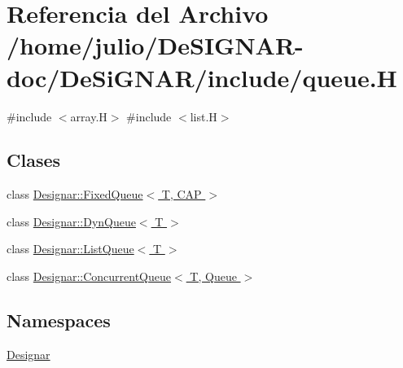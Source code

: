 \hypertarget{queue_8_h}{}\section{Referencia del Archivo /home/julio/\+De\+S\+I\+G\+N\+A\+R-\/doc/\+De\+Si\+G\+N\+A\+R/include/queue.H}
\label{queue_8_h}
{\ttfamily \#include $<$array.\+H$>$}\newline
{\ttfamily \#include $<$list.\+H$>$}\newline
\subsection*{Clases}
\begin{DoxyCompactItemize}
\item 
class \hyperlink{class_designar_1_1_fixed_queue}{Designar\+::\+Fixed\+Queue$<$ T, C\+A\+P $>$}
\item 
class \hyperlink{class_designar_1_1_dyn_queue}{Designar\+::\+Dyn\+Queue$<$ T $>$}
\item 
class \hyperlink{class_designar_1_1_list_queue}{Designar\+::\+List\+Queue$<$ T $>$}
\item 
class \hyperlink{class_designar_1_1_concurrent_queue}{Designar\+::\+Concurrent\+Queue$<$ T, Queue $>$}
\end{DoxyCompactItemize}
\subsection*{Namespaces}
\begin{DoxyCompactItemize}
\item 
 \hyperlink{namespace_designar}{Designar}
\end{DoxyCompactItemize}
